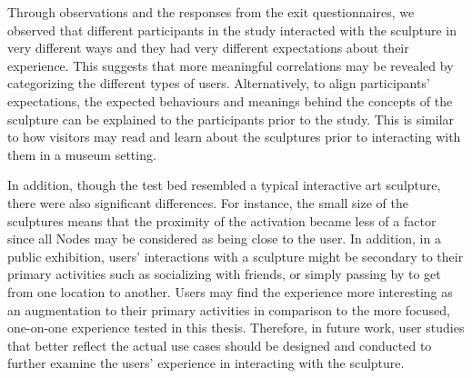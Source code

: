 Through observations and the responses from the exit questionnaires, we observed that different participants in the study interacted with the sculpture in very different ways and they had very different expectations about their experience. This suggests that more meaningful correlations may be revealed by categorizing the different types of users. Alternatively, to align participants' expectations, the expected behaviours and meanings behind the concepts of the sculpture can be explained to the participants prior to the study. This is similar to how visitors may read and learn about the sculptures prior to interacting with them in a museum setting. 
 
In addition, though the test bed resembled a typical interactive art sculpture, there were also significant differences. For instance, the small size of the sculptures means that the proximity of the activation became less of a factor since all Nodes may be considered as being close to the user. In addition, in a public exhibition, users' interactions with a sculpture might be secondary to their primary activities such as socializing with friends, or simply passing by to get from one location to another. Users may find the experience more interesting as an augmentation to their primary activities in comparison to the more focused, one-on-one experience tested in this thesis. Therefore, in future work, user studies that better reflect the actual use cases should be designed and conducted to further examine the users' experience in interacting with the sculpture.


